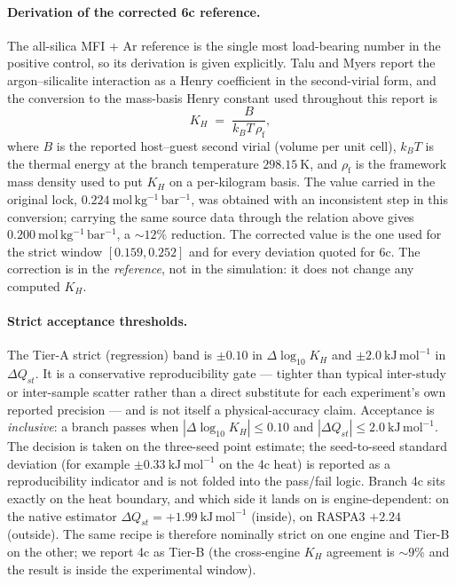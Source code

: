 \paragraph{Derivation of the corrected 6c reference.} The all-silica MFI + Ar reference is the single most load-bearing number in the positive control, so its derivation is given explicitly. Talu and Myers report the argon--silicalite interaction as a Henry coefficient in the second-virial form, and the conversion to the mass-basis Henry constant used throughout this report is
\begin{equation*}
K_H \;=\; \frac{B}{k_B T \, \rho_{\mathrm{f}}},
\end{equation*}
where \(B\) is the reported host--guest second virial (volume per unit cell), \(k_B T\) is the thermal energy at the branch temperature \(298.15\ \mathrm{K}\), and \(\rho_{\mathrm{f}}\) is the framework mass density used to put \(K_H\) on a per-kilogram basis. The value carried in the original lock, \(0.224\ \mathrm{mol\,kg^{-1}\,bar^{-1}}\), was obtained with an inconsistent step in this conversion; carrying the same source data through the relation above gives \(0.200\ \mathrm{mol\,kg^{-1}\,bar^{-1}}\), a \(\sim\!12\%\) reduction. The corrected value is the one used for the strict window \([0.159, 0.252]\) and for every deviation quoted for 6c. The correction is in the \emph{reference}, not in the simulation: it does not change any computed \(K_H\).

\paragraph{Strict acceptance thresholds.} The Tier-A strict (regression) band is \(\pm 0.10\) in \(\Delta\log_{10} K_H\) and \(\pm 2.0\ \mathrm{kJ\,mol^{-1}}\) in \(\Delta Q_{st}\). It is a conservative reproducibility gate --- tighter than typical inter-study or inter-sample scatter rather than a direct substitute for each experiment's own reported precision --- and is not itself a physical-accuracy claim. Acceptance is \emph{inclusive}: a branch passes when \(|\Delta\log_{10}K_H| \le 0.10\) and \(|\Delta Q_{st}| \le 2.0\ \mathrm{kJ\,mol^{-1}}\). The decision is taken on the three-seed point estimate; the seed-to-seed standard deviation (for example \(\pm 0.33\ \mathrm{kJ\,mol^{-1}}\) on the 4c heat) is reported as a reproducibility indicator and is not folded into the pass/fail logic. Branch 4c sits exactly on the heat boundary, and which side it lands on is engine-dependent: on the native estimator \(\Delta Q_{st} = +1.99\ \mathrm{kJ\,mol^{-1}}\) (inside), on RASPA3 \(+2.24\) (outside). The same recipe is therefore nominally strict on one engine and Tier-B on the other; we report 4c as Tier-B (the cross-engine \(K_H\) agreement is \(\sim\!9\%\) and the result is inside the experimental window).

